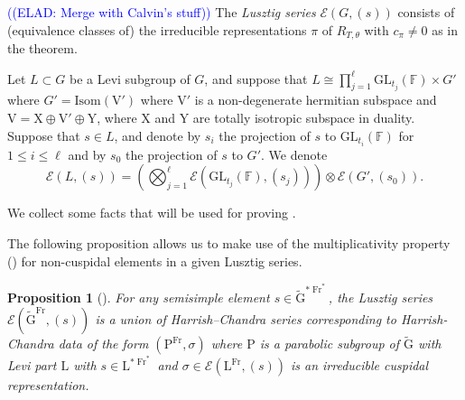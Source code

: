 \documentclass[12pt, reqno]{amsart}
\newtheorem{proposition}[theorem]{Proposition}
\theoremstyle{definition}
\theoremstyle{definition}
\theoremstyle{definition}
\newcommand{\hermitianSpace}{\mathrm{V}}
\newcommand{\xIsotropic}{\mathrm{X}}
\newcommand{\yIsotropic}{\mathrm{Y}}
\newcommand{\GL}{\mathrm{GL}}
\newcommand{\GroupExtension}[1]{\widetilde{#1}}
\newcommand{\finiteField}{\mathbb{F}}
\newcommand{\Frobenius}{\operatorname{Fr}}
\newcommand{\IsometryGroup}{\mathrm{Isom}}
\newcommand{\algebraicGroup}[1]{\boldsymbol{\mathrm{#1}}}
\newcommand{\LusztigSeries}[2]{\mathcal{E}\left(#1, (#2)\right)}
\newcommand{\DualFrobeniusFixedPoints}[2][\Frobenius^{\ast}]{\algebraicGroup{#2}^{\ast #1}}
\newcommand{\FrobeniusFixedPoints}[2][\Frobenius]{\algebraicGroup{#2}^{#1}}
\newcommand{\elad}[1]{\textcolor{blue}{\sffamily ((ELAD: #1))}}
\begin{document}
\elad{Merge with Calvin's stuff}
The \emph{Lusztig series} $\LusztigSeries{G}{s}$ consists of (equivalence classes of) the irreducible representations $\pi$ of $R_{T, \theta}$ with $c_{\pi} \ne 0$ as in the theorem.

Let $L \subset G$ be a Levi subgroup of $G$, and suppose that $L \cong \prod_{j=1}^\ell \GL_{t_j}\left(\finiteField\right) \times G'$ where $G' = \IsometryGroup\left(\hermitianSpace'\right)$ where $\hermitianSpace'$ is a non-degenerate hermitian subspace and $\hermitianSpace = \xIsotropic \oplus \hermitianSpace' \oplus \yIsotropic$, where $\xIsotropic$ and $\yIsotropic$ are totally isotropic subspace in duality. Suppose that $s \in L$, and denote by $s_i$ the projection of $s$ to $\GL_{t_i}\left(\finiteField\right)$ for $1 \le i \le \ell$ and by $s_0$ the projection of $s$ to $G'$. We denote
$$\LusztigSeries{L}{s} = \left(\bigotimes_{j=1}^{\ell} \LusztigSeries{\GL_{t_j}\left(\finiteField\right)}{s_j}\right) \otimes \LusztigSeries{G'}{s_0}.$$

We collect some facts that will be used for proving .

The following proposition allows us to make use of the multiplicativity property () for non-cuspidal elements in a given Lusztig series.
\begin{proposition}[{\cite[Proof of Corollary 3.3.21]{GeckMalle2020}}]
	For any semisimple element $s \in \DualFrobeniusFixedPoints{\GroupExtension{G}}$, the Lusztig series $\LusztigSeries{\FrobeniusFixedPoints{\GroupExtension{G}}}{s}$ is a union of Harrish--Chandra series corresponding to Harrish-Chandra data of the form $\left(\FrobeniusFixedPoints{\algebraicGroup{P}},\sigma\right)$ where $\algebraicGroup{P}$ is a parabolic subgroup of $\algebraicGroup{\GroupExtension{G}}$ with Levi part $\algebraicGroup{L}$ with $s \in \DualFrobeniusFixedPoints{L}$ and $\sigma \in \LusztigSeries{\FrobeniusFixedPoints{L}}{s}$ is an irreducible cuspidal representation.
\end{proposition}
\end{document}
